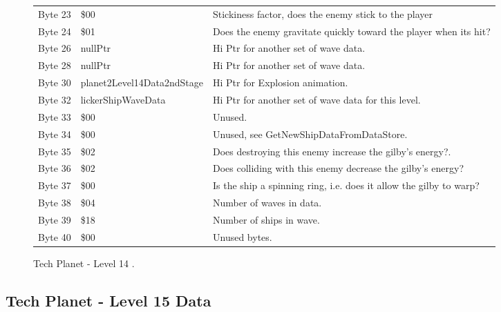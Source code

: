 \begin{figure}[H]
{\begin{adjustbox}{width=12cm}
\begin{tabular}{lll}
 Byte 23 & \$00                        & Stickiness factor, does the enemy stick to the player              \\
 Byte 24 & \$01                        & Does the enemy gravitate quickly toward the player when its hit?   \\
 Byte 26 & nullPtr                    & Hi Ptr for another set of wave data.                               \\
 Byte 28 & nullPtr                    & Hi Ptr for another set of wave data.                               \\
 Byte 30 & planet2Level14Data2ndStage & Hi Ptr for Explosion animation.                                    \\
 Byte 32 & lickerShipWaveData         & Hi Ptr for another set of wave data for this level.                \\
 Byte 33 & \$00                        & Unused.                                                            \\
 Byte 34 & \$00                        & Unused, see GetNewShipDataFromDataStore.                           \\
 Byte 35 & \$02                        & Does destroying this enemy increase the gilby's energy?.           \\
 Byte 36 & \$02                        & Does colliding with this enemy decrease the gilby's energy?        \\
 Byte 37 & \$00                        & Is the ship a spinning ring, i.e. does it allow the gilby to warp? \\
 Byte 38 & \$04                        & Number of waves in data.                                           \\
 Byte 39 & \$18                        & Number of ships in wave.                                           \\
 Byte 40 & \$00                        & Unused bytes.                                                      \\
\bottomrule
\end{tabular}

  \end{adjustbox}

  }\caption*{Tech Planet - Level 14
.}
\end{figure}

\clearpage
\subsection{Tech Planet - Level 15 Data}

